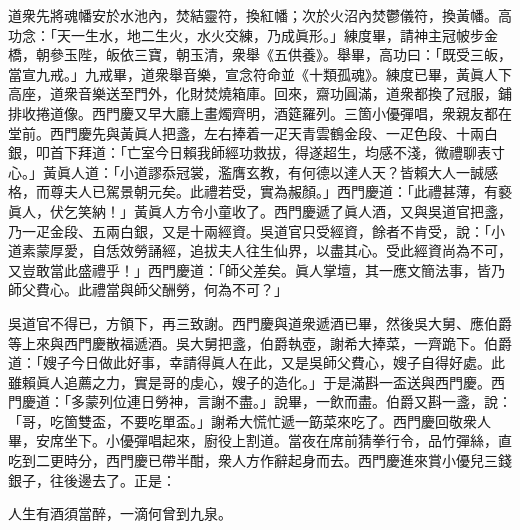 道衆先將魂幡安於水池內，焚結靈符，換紅幡；次於火沼內焚鬱儀符，換黃幡。高功念：「天一生水，地二生火，水火交練，乃成眞形。」練度畢，請神主冠帔步金橋，朝參玉陛，皈依三寶，朝玉清，衆舉《五供養》。舉畢，高功曰：「既受三皈，當宣九戒。」九戒畢，道衆舉音樂，宣念符命並《十類孤魂》。練度已畢，黃眞人下高座，道衆音樂送至門外，化財焚燒箱庫。回來，齋功圓滿，{}道衆都換了冠服，鋪排收捲道像。西門慶又早大廳上畫燭齊明，酒筵羅列。三箇小優彈唱，衆親友都在堂前。西門慶先與黃眞人把盞，左右捧着一疋天青雲鶴金段、一疋色段、十兩白銀，叩首下拜道：「亡室今日賴我師經功救拔，得遂超生，均感不淺，微禮聊表寸心。」黃眞人道：「小道謬忝冠裳，濫膺玄教，有何德以達人天？皆賴大人一誠感格，而尊夫人已駕景朝元矣。此禮若受，實為赧顏。」西門慶道：「此禮甚薄，有褻眞人，伏乞笑納！」黃眞人方令小童收了。西門慶遞了眞人酒，又與吳道官把盞，乃一疋金段、五兩白銀，又是十兩經資。吳道官只受經資，餘者不肯受，說：「小道素蒙厚愛，自恁效勞誦經，追拔夫人往生仙界，以盡其心。受此經資尚為不可，又豈敢當此盛禮乎！」西門慶道：「師父差矣。眞人掌壇，其一應文簡法事，皆乃師父費心。此禮當與師父酬勞，何為不可？」

吳道官不得已，方領下，再三致謝。西門慶與道衆遞酒已畢，然後吳大舅、應伯爵等上來與西門慶散福遞酒。吳大舅把盞，伯爵執壺，謝希大捧菜，一齊跪下。伯爵道：「嫂子今日做此好事，幸請得眞人在此，又是吳師父費心，嫂子自得好處。此雖賴眞人追薦之力，實是哥的虔心，嫂子的造化。」于是滿斟一盃送與西門慶。西門慶道：「多蒙列位連日勞神，言謝不盡。」{}說畢，一飲而盡。伯爵又斟一盞，說：「哥，吃箇雙盃，不要吃單盃。」謝希大慌忙遞一筯菜來吃了。西門慶回敬衆人畢，安席坐下。小優彈唱起來，廚役上割道。當夜在席前猜拳行令，品竹彈絲，直吃到二更時分，西門慶已帶半酣，衆人方作辭起身而去。西門慶進來賞小優兒三錢銀子，往後邊去了。正是：

\begin{myquote}
人生有酒須當醉，一滴何曾到九泉。
\end{myquote}

